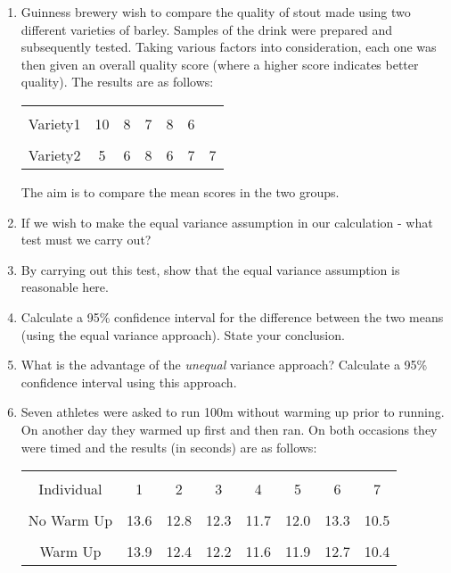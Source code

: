 \documentclass[]{report}
\begin{document}
\begin{enumerate}
\item 
Guinness brewery wish to compare the quality of stout made using two different varieties of barley. Samples of the drink were prepared and subsequently tested. Taking various factors into consideration, each one was then given an overall quality score (where a higher score indicates better quality). The results are as follows:\\[-0.3cm]
\begin{center}
\begin{tabular}{|c|cccccc|}
\cline{1-7}
&&&&&&\\
Variety1 & 10 & 8 & 7 & 8 & 6 & \\[0.2cm]
\cline{1-7}
&&&&&&\\
Variety2 & 5  & 6 & 8 & 6 & 7 & 7 \\[0.2cm]
\cline{1-7}
\end{tabular}
\end{center}

The aim is to compare the mean scores in the two groups.\\[0.3cm]
\item If we wish to make the equal variance assumption in our calculation - what test must we carry out? 
 \item By carrying out this test, show that the equal variance assumption is reasonable here. 
 \item Calculate a 95\% confidence interval for the difference between the two means (using the equal variance approach). State your conclusion. 
 \item What is the advantage of the \emph{unequal} variance approach? Calculate a 95\% confidence interval using this approach.

\item 
Seven athletes were asked to run 100m without warming up prior to running. On another day they warmed up first and then ran. On both occasions they were timed and the results (in seconds) are as follows:\\[-0.3cm]
\begin{center}
\begin{tabular}{|c|ccccccc|}
\hline
&&&&&&&\\[-0.3cm]
Individual & 1 & 2 & 3 & 4 & 5 & 6 & 7 \\[0.1cm]
\hline
&&&&&&&\\[-0.3cm]
No Warm Up    & 13.6 & 12.8 & 12.3 & 11.7 & 12.0 & 13.3 & 10.5 \\[0.1cm]
\hline
&&&&&&&\\[-0.3cm]
Warm Up       & 13.9 & 12.4 & 12.2 & 11.6 & 11.9 & 12.7 & 10.4 \\[0.1cm]
\hline
\end{tabular}
\end{center}


\end{enumerate}
\end{document}
